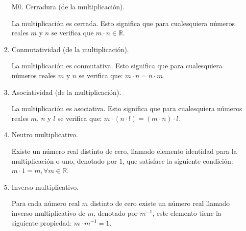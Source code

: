 \documentclass[11pt]{article}
\newcommand{\R}{\mathbb{R}}
\begin{document}
\begin{enumerate}[label=M\arabic*., start=0]
    \item[M0.] Cerradura (de la multiplicación).
    
    La multiplicación es cerrada. Esto significa que para cualesquiera números reales $m$ y $n$ se verifica que $m\cdot n\in \R$.

    \item Conmutatividad (de la multiplicación).
    
    La multiplicación es conmutativa. Esto significa que para cualesquiera números reales $m$ y $n$ se verifica que: $ m \cdot n = n \cdot m $.

    \item Asociatividad (de la multiplicación).
    
    La multiplicación es asociativa. Esto significa que para cualesquiera números reales $m$, $n$ y $l$ se verifica que: $ m \cdot (n \cdot l) = (m \cdot n) \cdot l $.

    \item Neutro multiplicativo.
    
    Existe un número real distinto de cero, llamado elemento identidad para la multiplicación o uno, denotado por $1$, que satisface la siguiente condición: $ m \cdot 1 = m,\forall m \in \R $.

    \item Inverso multiplicativo.
    
    Para cada número real $m$ distinto de cero existe un número real llamado inverso multiplicativo de $m$, denotado por $m^{-1}$, este elemento tiene la siguiente propiedad: $m \cdot m^{-1} = 1$.
\end{enumerate}
\end{document}
